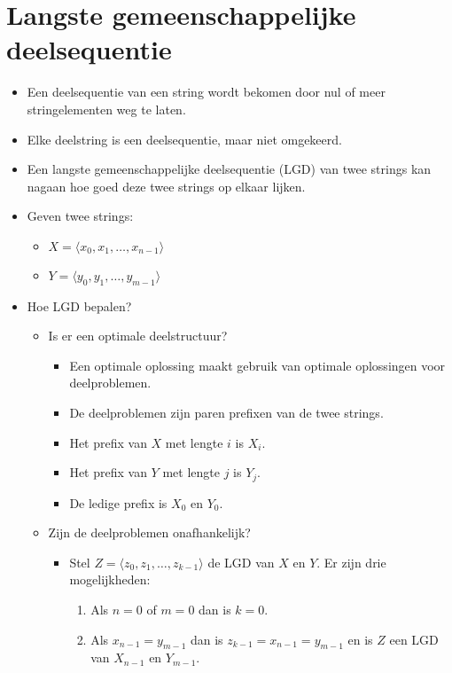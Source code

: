 \section{Langste gemeenschappelijke deelsequentie}
\begin{itemize}
    \item Een deelsequentie van een string wordt bekomen door nul of meer stringelementen weg te laten.
    \item Elke deelstring is een deelsequentie, maar niet omgekeerd.
    \item Een langste gemeenschappelijke deelsequentie (LGD) van twee strings kan nagaan hoe goed deze twee strings op elkaar lijken.
    \item Geven twee strings:
    \begin{itemize}
        \item $X = \langle x_0, x_1, \dots, x_{n - 1}\rangle$
        \item $Y = \langle y_0, y_1, \dots, y_{m - 1}\rangle$
    \end{itemize}
    \item Hoe LGD bepalen?
    \begin{itemize}
        \item Is er een optimale deelstructuur?
        \begin{itemize}
            \item Een optimale oplossing maakt gebruik van optimale oplossingen voor deelproblemen.
            \item De deelproblemen zijn paren prefixen van de twee strings. 
            \item Het prefix van $X$ met lengte $i$ is $X_i$.
            \item Het prefix van $Y$ met lengte $j$ is $Y_j$.
            \item De ledige prefix is $X_0$ en $Y_0$.
        \end{itemize}
        \item Zijn de deelproblemen onafhankelijk?
        \begin{itemize}
            \item Stel $Z = \langle z_0, z_1, \dots, z_{k - 1} \rangle$ de LGD van $X$ en $Y$. Er zijn drie mogelijkheden:
            \begin{enumerate}
                \item Als $n = 0$ of $m = 0$ dan is $k = 0$.
                \item Als $x_{n - 1} = y_{m - 1}$ dan is $z_{k - 1} = x_{n - 1} = y_{m - 1}$ en is $Z$ een LGD van $X_{n - 1}$ en $Y_{m - 1}$.

\end{enumerate}
\end{itemize}
\end{itemize}
\end{itemize}
